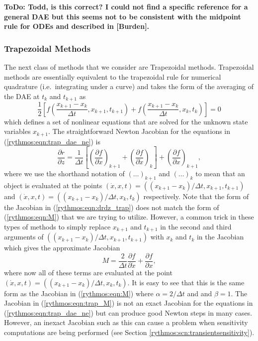 \documentclass[pdf,ps2pdf,11pt]{SANDreport}
\begin{document}
{}\textbf{ToDo: Todd, is this correct?  I could not find a specific reference
for a general DAE but this seems not to be consistent with the midpoint rule
for ODEs and described in [Burden].}

\subsubsection{Trapezoidal Methods}

The next class of methods that we consider are Trapezoidal methods.
Trapezoidal methods are essentially equivalent to the trapezoidal rule for
numerical quadrature (i.e.\ integrating under a curve) and takes the form of
the averaging of the DAE at $t_k$ and $t_{k+1}$ as
%
\begin{equation}
\frac{1}{2} \left[
f\left( \frac{x_{k+1} - x_{k}}{\Delta t}, x_{k+1} , t_{k+1} \right)
+ f\left( \frac{x_{k+1} - x_{k}}{\Delta t}, x_k , t_k \right)
\right]
 = 0
\label{rythmos:eqn:trap_dae_ne}
\end{equation}
%
which defines a set of nonlinear equations that are solved for the unknown
state variables $x_{k+1}$.  The straightforward Newton Jacobian for the
equations in (\ref{rythmos:eqn:trap_dae_ne}) is
%
\begin{equation}
\frac{\partial r}{\partial z}
= \frac{1}{\Delta t} \left[
\left( \frac{\partial f}{\partial \dot{x}} \right)_{k+1}
+ \left( \frac{\partial f}{\partial \dot{x}} \right)_{k}
\right]
+ \left( \frac{\partial f}{\partial x} \right)_{k+1},
\label{rythmos:eqn:drdz_trap}
\end{equation}
%
where we use the shorthand notation of $(\ldots)_{k+1}$ and $(\ldots)_k$ to
mean that an object is evaluated at the points $(\dot{x},x,t) =
((x_{k+1}-x_k)/\Delta t, x_{k+1}, t_{k+1})$ and $(\dot{x},x,t) =
((x_{k+1}-x_k)/\Delta t, x_k, t_k)$ respectively.  Note that the form of the
Jacobian in (\ref{rythmos:eqn:drdz_trap}) does not match the form of
(\ref{rythmos:eqn:M}) that we are trying to utilize.  However, a common trick
in these types of methods to simply replace $x_{k+1}$ and $t_{k+1}$ in the
second and third arguments of $((x_{k+1}-x_k)/\Delta t, x_{k+1}, t_{k+1})$
with $x_k$ and $t_k$ in the Jacobian which gives the approximate Jacobian
%
\begin{equation}
M
= \frac{2}{\Delta t} \frac{\partial f}{\partial \dot{x}}
+ \frac{\partial f}{\partial x},
\label{rythmos:eqn:trap_M}
\end{equation}
%
where now all of these terms are evaluated at the point $(\dot{x},x,t) =
((x_{k+1}-x_k)/\Delta t, x_k, t_k)$.  It is easy to see that this is the same
form as the Jacobian in (\ref{rythmos:eqn:M}) where $\alpha = 2/\Delta t$ and
and $\beta = 1$.  The Jacobian in (\ref{rythmos:eqn:trap_M}) is not an exact
Jacobian for the equations in (\ref{rythmos:eqn:trap_dae_ne}) but can produce
good Newton steps in many cases.  However, an inexact Jacobian such as this
can cause a problem when sensitivity computations are being performed (see
Section
\ref{rythmos:scn:transientsensitivity}).
\end{document}
